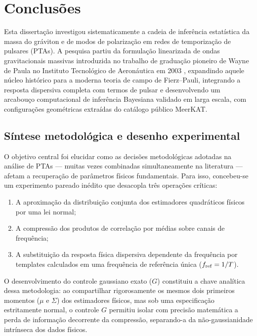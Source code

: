 \chapter{Conclusões}
\label{chap:conclusoes}

Esta dissertação investigou sistematicamente a cadeia de inferência estatística da massa do gráviton e de modos de polarização em redes de temporização de pulsares (PTAs). A pesquisa partiu da formulação linearizada de ondas gravitacionais massivas introduzida no trabalho de graduação pioneiro de Wayne de Paula no Instituto Tecnológico de Aeronáutica em 2003 \autocite{tg2003,depaula2004}, expandindo aquele núcleo histórico para a moderna teoria de campo de Fierz--Pauli, integrando a resposta dispersiva completa com termos de pulsar e desenvolvendo um arcabouço computacional de inferência Bayesiana validado em larga escala, com configurações geométricas extraídas do catálogo público MeerKAT.

\section{Síntese metodológica e desenho experimental}

O objetivo central foi elucidar como as decisões metodológicas adotadas na análise de PTAs — muitas vezes combinadas simultaneamente na literatura — afetam a recuperação de parâmetros físicos fundamentais. Para isso, concebeu-se um experimento pareado inédito que desacopla três operações críticas:
\begin{enumerate}
  \item A aproximação da distribuição conjunta dos estimadores quadráticos físicos por uma lei normal;
  \item A compressão dos produtos de correlação por médias sobre canais de frequência;
  \item A substituição da resposta física dispersiva dependente da frequência por templates calculados em uma frequência de referência única ($f_{\rm ref} = 1/T$).
\end{enumerate}

O desenvolvimento do controle gaussiano exato ($G$) constituiu a chave analítica dessa metodologia: ao compartilhar rigorosamente os mesmos dois primeiros momentos ($\mu$ e $\Sigma$) dos estimadores físicos, mas sob uma especificação estritamente normal, o controle $G$ permitiu isolar com precisão matemática a perda de informação decorrente da compressão, separando-a da não-gaussianidade intrínseca dos dados físicos.

